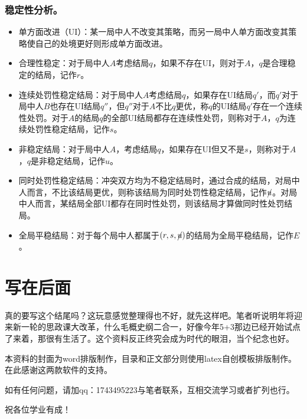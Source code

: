 \documentclass{article}
\begin{document}
\subsubsection{稳定性分析。}
\begin{itemize}
    \item 单方面改进（UI）：某一局中人不改变其策略，而另一局中人单方面改变其策略使自己的处境更好则形成单方面改进。
    \item 合理性稳定：对于局中人$A$考虑结局$q$，如果不存在UI，则对于$A$，$q$是合理稳定的结局，记作$r$。
    \item 连续处罚性稳定结局：对于局中人$A$考虑结局$q$，如果存在UI结局$q'$，而$q'$对于局中人$B$也存在UI结局$q''$，但$q''$对于$A$不比$q$更优，称$q$的UI结局$q'$存在一个连续性处罚。对于$A$的结局$q$的全部UI结局都存在连续性处罚，则称对于$A$，$q$为连续处罚性稳定结局，记作$s$。
    \item 非稳定结局：对于局中人$A$，考虑结局$q$，如果存在UI但又不是$s$，则称对于$A$，$q$是非稳定结局，记作$u$。
    \item 同时处罚性稳定结局：冲突双方均为不稳定结局时，通过合成的结局，对局中人而言，不比该结局更优，则称该结局为同时处罚性稳定结局，记作$\cancel{u}$。对局中人而言，某结局全部UI都存在同时性处罚，则该结局才算做同时性处罚结局。
    \item 全局平稳结局：对于每个局中人都属于$(r,s,\cancel{u})$的结局为全局平稳结局，记作$E$。
\end{itemize}

\newpage

\section*{写在后面}

真的要写这个结尾吗？这玩意感觉整理得也不好，就先这样吧。笔者听说明年将迎来新一轮的思政课大改革，什么毛概史纲二合一，好像今年5+3那边已经开始试点了来着，那很有生活了。这个资料反正终究会成为时代的眼泪，当个纪念也好。

本资料的封面为word排版制作，目录和正文部分则使用latex自创模板排版制作。在此感谢这两款软件的支持。

如有任何问题，请加qq：1743495223与笔者联系，互相交流学习或者扩列也行。

祝各位学业有成！


\end{document}
